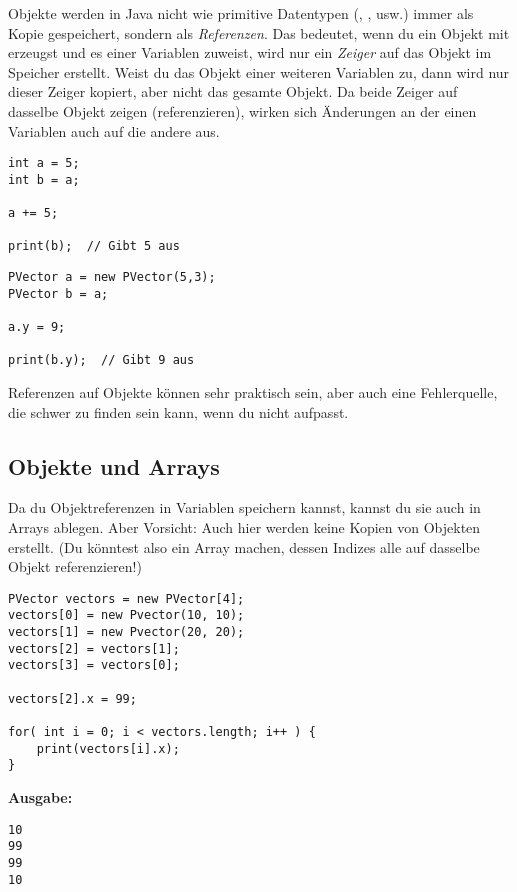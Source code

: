 \documentclass[9pt, a4paper]{arbeitsblatt}
\begin{document}
\ReiheTitel

Objekte werden in Java nicht wie primitive Datentypen (, , usw.) immer als Kopie gespeichert, sondern als \emph{Referenzen}. Das bedeutet, wenn du ein Objekt mit  erzeugst und es einer Variablen zuweist, wird nur ein \emph{Zeiger} auf das Objekt im Speicher erstellt. Weist du das Objekt einer weiteren Variablen zu, dann wird nur dieser Zeiger kopiert, aber nicht das gesamte Objekt. Da beide Zeiger auf dasselbe Objekt zeigen (referenzieren), wirken sich Änderungen an der einen Variablen auch auf die andere aus.

\begin{links}
\begin{verbatim}
int a = 5;
int b = a;

a += 5;

print(b);  // Gibt 5 aus
\end{verbatim}
\end{links}\begin{rechts}
\begin{verbatim}
PVector a = new PVector(5,3);
PVector b = a;

a.y = 9;

print(b.y);  // Gibt 9 aus
\end{verbatim}
\end{rechts}

Referenzen auf Objekte können sehr praktisch sein, aber auch eine Fehlerquelle, die schwer zu finden sein kann, wenn du nicht aufpasst.

\subsection*{Objekte und Arrays}

Da du Objektreferenzen in Variablen speichern kannst, kannst du sie auch in Arrays ablegen. Aber Vorsicht: Auch hier werden keine Kopien von Objekten erstellt. (Du könntest also ein Array machen, dessen Indizes alle auf dasselbe Objekt referenzieren!)

\begin{links}[.65]
\begin{verbatim}
PVector vectors = new PVector[4];
vectors[0] = new Pvector(10, 10);
vectors[1] = new Pvector(20, 20);
vectors[2] = vectors[1];
vectors[3] = vectors[0];

vectors[2].x = 99;

for( int i = 0; i < vectors.length; i++ ) {
	print(vectors[i].x);
}
\end{verbatim}
\end{links}\begin{rechts}[.3]
\vspace*{1em}\textbf{Ausgabe:}
\begin{verbatim}
10
99
99
10
\end{verbatim}
\end{rechts}
\end{document}
